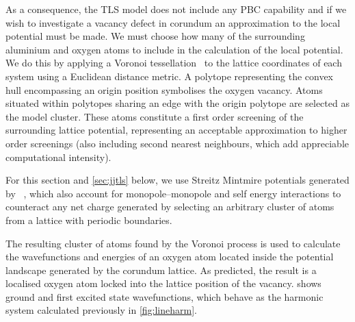 As a consequence, the TLS model does not include any PBC capability and if we wish to investigate a vacancy defect in corundum an approximation to the local potential must be made.
We must choose how many of the surrounding aluminium and oxygen atoms to include in the calculation of the local potential.
We do this by applying a Voronoi tessellation~\cite{Voronoi1908} to the lattice coordinates of each system using a Euclidean distance metric.
A polytope representing the convex hull encompassing an origin position symbolises the oxygen vacancy.
Atoms situated within polytopes sharing an edge with the origin polytope are selected as the model cluster.
These atoms constitute a first order screening of the surrounding lattice potential, representing an acceptable approximation to higher order screenings (\eg also including second nearest neighbours, which add appreciable computational intensity).


For this section and \cref{sec:jjtls} below, we use Streitz Mintmire potentials generated by ~\cite{Gale2003}, which also account for monopole--monopole and self energy interactions to counteract any net charge generated by selecting an arbitrary cluster of atoms from a lattice with periodic boundaries.

The resulting cluster of atoms found by the Voronoi process is used to calculate the wavefunctions and energies of an oxygen atom located inside the potential landscape generated by the corundum lattice.
As predicted, the result is a localised oxygen atom locked into the lattice position of the vacancy.
 shows ground and first excited state wavefunctions, which behave as the harmonic system calculated previously in \cref{fig:lineharm}.

